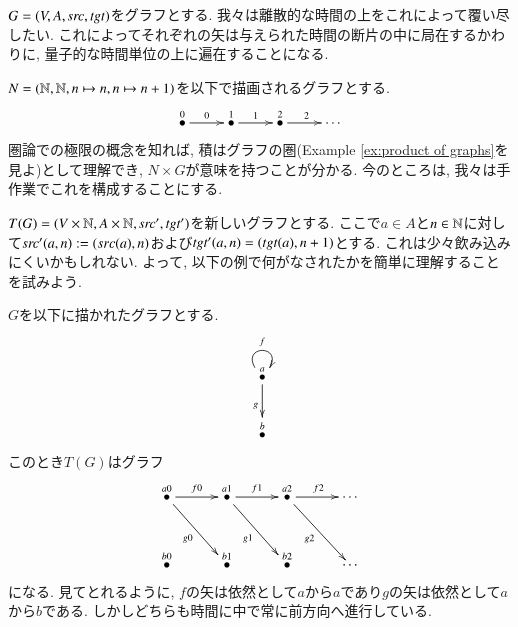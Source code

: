 \begin{example}\label{ex:ZxG}


$G=(V,A,\operatorname{\mathit{src}},\operatorname{\mathit{tgt}})$をグラフとする. 我々は離散的な時間の上をこれによって覆い尽したい. これによってそれぞれの矢は与えられた時間の断片の中に局在するかわりに, 量子的な時間単位の上に遍在することになる.


$N=({\mathbb N},{\mathbb N},n\mapsto n,n\mapsto n+1)$を以下で描画されるグラフとする.
$$\xymatrix{\LMO{0}\ar[r]^0&\LMO{1}\ar[r]^1&\LMO{2}\ar[r]^2&\cdots}$$
圏論での極限の概念を知れば, 積はグラフの圏(Example \ref{ex:product of graphs}を見よ)として理解でき, $N\times G$が意味を持つことが分かる. 今のところは, 我々は手作業でこれを構成することにする.


$T(G)=(V\times {\mathbb N},A\times{\mathbb N},\operatorname{\mathit{src}}',\operatorname{\mathit{tgt}}')$を新しいグラフとする. ここで$a\in A$と$n\in{\mathbb N}$に対して$\operatorname{\mathit{src}}'(a,n):=(src(a),n)$および$\operatorname{\mathit{tgt}}'(a,n)=(tgt(a),n+1)$とする. これは少々飲み込みにくいかもしれない. よって, 以下の例で何がなされたかを簡単に理解することを試みよう.


$G$を以下に描かれたグラフとする.
$$\xymatrix{\LMO{a}\ar@(ul,ur)[]^f\ar[d]_g\\\LMO{b}}$$
このとき$T(G)$はグラフ
$$\xymatrix@=30pt{
\LMO{a0}\ar[r]^{f0}\ar[rd]_{g0}&\LMO{a1}\ar[r]^{f1}\ar[rd]_{g1}&\LMO{a2}\ar[r]^{f2}\ar[rd]_{g2}&\cdots\\
\LMO{b0}&\LMO{b1}&\LMO{b2}&\cdots
}
$$
になる. 見てとれるように, $f$の矢は依然として$a$から$a$であり$g$の矢は依然として$a$から$b$である. しかしどちらも時間に中で常に前方向へ進行している.

\end{example}

